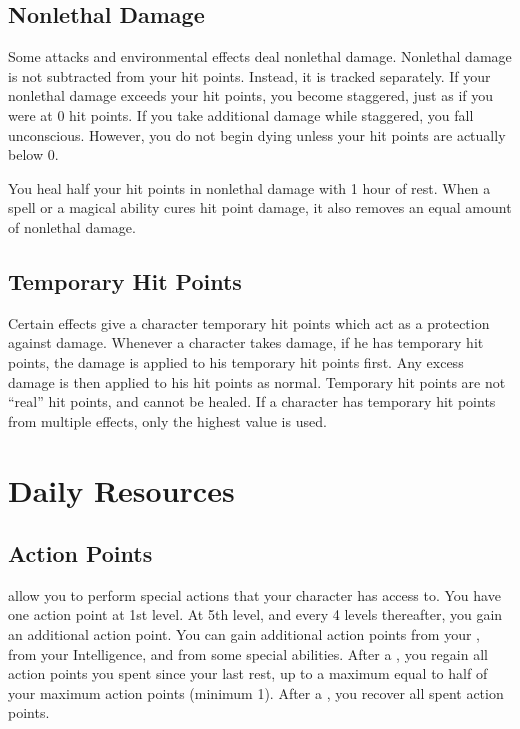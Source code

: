     \subsection{Nonlethal Damage}\label{Nonlethal Damage}
        Some attacks and environmental effects deal nonlethal damage.
        Nonlethal damage is not subtracted from your hit points.
        Instead, it is tracked separately.
        If your nonlethal damage exceeds your hit points, you become staggered, just as if you were at 0 hit points.
        If you take additional damage while staggered, you fall unconscious.
        However, you do not begin dying unless your hit points are actually below 0.

        You heal half your hit points in nonlethal damage with 1 hour of rest.
        When a spell or a magical ability cures hit point damage, it also removes an equal amount of nonlethal damage.

    \subsection{Temporary Hit Points}\label{Temporary Hit Points}
        Certain effects give a character temporary hit points which act as a protection against damage.
        Whenever a character takes damage, if he has temporary hit points, the damage is applied to his temporary hit points first.
        Any excess damage is then applied to his hit points as normal.
        Temporary hit points are not ``real'' hit points, and cannot be healed.
        If a character has temporary hit points from multiple effects, only the highest value is used.

\section{Daily Resources}

    \subsection{Action Points}\label{Action Points}
         allow you to perform special actions that your character has access to.
        You have one action point at 1st level.
        At 5th level, and every 4 levels thereafter, you gain an additional action point.
        You can gain additional action points from your , from your Intelligence, and from some special abilities.
        After a , you regain all action points you spent since your last rest, up to a maximum equal to half of your maximum action points (minimum 1).
        After a , you recover all spent action points.

